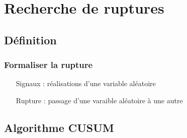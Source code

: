\documentclass{beamer}
\begin{document}
		
		
		

\section{Recherche de ruptures}

\subsection{Définition}

\begin{frame}

\frametitle{Formaliser la rupture}

\begin{itemize}

	\item[Signaux]: réalisations d'une variable aléatoire
	
	\item[Rupture]: passage d'une varaible aléatoire à une autre

\end{itemize}

\end{frame}

\subsection{Algorithme CUSUM}
\end{document}
